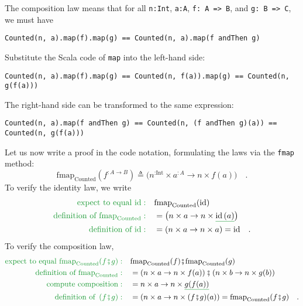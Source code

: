 The composition law means that for all \lstinline!n:Int!, \lstinline!a:A!,
\lstinline!f: A => B!, and \lstinline!g: B => C!, we must have
\begin{lstlisting}
Counted(n, a).map(f).map(g) == Counted(n, a).map(f andThen g)
\end{lstlisting}
Substitute the Scala code of \lstinline!map! into the left-hand side:
\begin{lstlisting}
Counted(n, a).map(f).map(g) == Counted(n, f(a)).map(g) == Counted(n, g(f(a)))
\end{lstlisting}
The right-hand side can be transformed to the same expression:
\begin{lstlisting}
Counted(n, a).map(f andThen g) == Counted(n, (f andThen g)(a)) == Counted(n, g(f(a)))
\end{lstlisting}

Let us now write a proof in the code notation, formulating the laws
via the \lstinline!fmap! method:
\[
\text{fmap}_{\text{Counted}}(f^{:A\rightarrow B})\triangleq\big(n^{:\text{Int}}\times a^{:A}\rightarrow n\times f(a)\big)\quad.
\]
To verify the identity law, we write
\begin{align*}
{\color{greenunder}\text{expect to equal }\text{id}:}\quad & \text{fmap}_{\text{Counted}}(\text{id})\\
{\color{greenunder}\text{definition of }\text{fmap}_{\text{Counted}}:}\quad & =\big(n\times a\rightarrow n\times\gunderline{\text{id}\,(a)}\big)\\
{\color{greenunder}\text{definition of }\text{id}:}\quad & =\left(n\times a\rightarrow n\times a\right)=\text{id}\quad.
\end{align*}
To verify the composition law,
\begin{align*}
{\color{greenunder}\text{expect to equal }\text{fmap}_{\text{Counted}}(f\bef g):}\quad & \text{fmap}_{\text{Counted}}(f)\bef\text{fmap}_{\text{Counted}}(g)\\
{\color{greenunder}\text{definition of }\text{fmap}_{\text{Counted}}:}\quad & =\left(n\times a\rightarrow n\times f(a)\right)\bef\left(n\times b\rightarrow n\times g(b)\right)\\
{\color{greenunder}\text{compute composition}:}\quad & =n\times a\rightarrow n\times\gunderline{g(f(a))}\\
{\color{greenunder}\text{definition of }\left(f\bef g\right):}\quad & =\left(n\times a\rightarrow n\times(f\bef g)(a)\right)=\text{fmap}_{\text{Counted}}(f\bef g)\quad.
\end{align*}

